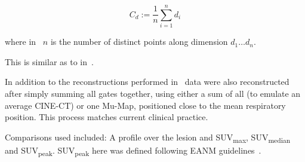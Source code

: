                 \begin{equation} \label{eq:pet_ct_respiratory_motion_correction_with_a_single_attenuation_map_using_nac_derived_deformation_fields_methods_com}
                   C_{d} := \frac{1}{n}\sum_{i=1}^{n} d_{i}
                \end{equation}
                
                \noindent where in~ $n$ is the number of distinct points along dimension $d_1 \dotso d_n$.
                
                This is similar as to in~.
                
                In addition to the reconstructions performed in~ data were also reconstructed after simply summing all gates together, using either a sum of all  (to emulate an average CINE-CT) or one \gls{Mu-Map}, positioned close to the mean respiratory position. This process matches current clinical practice. 
                
                Comparisons used included: A profile over the lesion and \gls{SUV}\textsubscript{max}, \gls{SUV}\textsubscript{median} and \gls{SUV}\textsubscript{peak}. \gls{SUV}\textsubscript{peak} here was defined following \gls{EANM} guidelines~.
            
